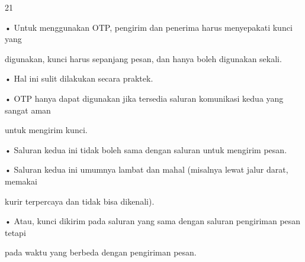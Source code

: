 \documentclass{article}
\begin{document}

21

• Untuk menggunakan OTP, pengirim dan penerima harus menyepakati kunci yang 

digunakan, kunci harus  sepanjang pesan, dan hanya boleh digunakan sekali. 

• Hal ini sulit dilakukan secara praktek. 

• OTP hanya dapat digunakan jika tersedia saluran komunikasi kedua yang sangat aman 

untuk mengirim kunci. 

• Saluran kedua ini tidak boleh sama dengan saluran untuk mengirim pesan.

• Saluran kedua ini umumnya lambat dan mahal (misalnya lewat jalur darat, memakai 

kurir terpercaya dan tidak bisa dikenali). 

• Atau, kunci dikirim pada saluran yang sama dengan saluran pengiriman pesan tetapi 

pada waktu yang berbeda dengan pengiriman pesan.
\end{document}
